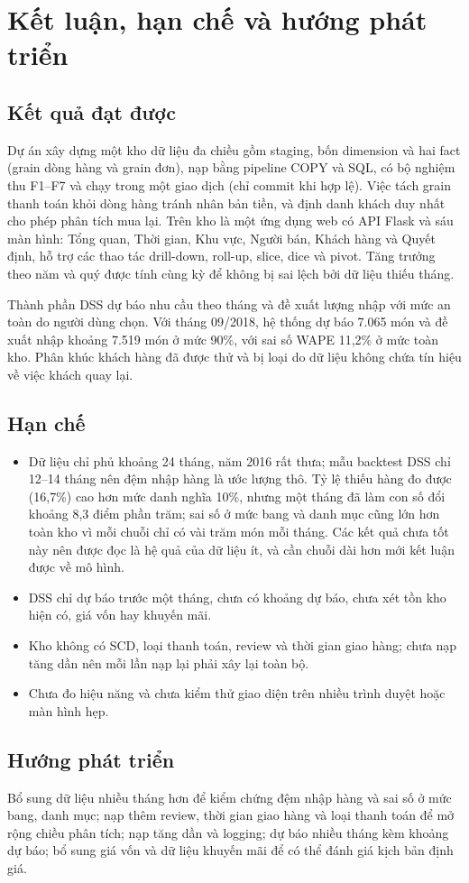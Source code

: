 \section{Kết luận, hạn chế và hướng phát triển}
\subsection{Kết quả đạt được}
Dự án xây dựng một kho dữ liệu đa chiều gồm staging, bốn dimension và hai fact (grain dòng hàng và grain đơn), nạp bằng pipeline COPY và SQL, có bộ nghiệm thu F1--F7 và chạy trong một giao dịch (chỉ commit khi hợp lệ). Việc tách grain thanh toán khỏi dòng hàng tránh nhân bản tiền, và định danh khách duy nhất cho phép phân tích mua lại. Trên kho là một ứng dụng web có API Flask và sáu màn hình: Tổng quan, Thời gian, Khu vực, Người bán, Khách hàng và Quyết định, hỗ trợ các thao tác drill-down, roll-up, slice, dice và pivot. Tăng trưởng theo năm và quý được tính cùng kỳ để không bị sai lệch bởi dữ liệu thiếu tháng.

Thành phần DSS dự báo nhu cầu theo tháng và đề xuất lượng nhập với mức an toàn do người dùng chọn. Với tháng 09/2018, hệ thống dự báo 7.065 món và đề xuất nhập khoảng 7.519 món ở mức 90\%, với sai số WAPE 11,2\% ở mức toàn kho. Phân khúc khách hàng đã được thử và bị loại do dữ liệu không chứa tín hiệu về việc khách quay lại.

\subsection{Hạn chế}
\begin{itemize}[leftmargin=*]
\item Dữ liệu chỉ phủ khoảng 24 tháng, năm 2016 rất thưa; mẫu backtest DSS chỉ 12--14 tháng nên đệm nhập hàng là ước lượng thô. Tỷ lệ thiếu hàng đo được (16,7\%) cao hơn mức danh nghĩa 10\%, nhưng một tháng đã làm con số đổi khoảng 8,3 điểm phần trăm; sai số ở mức bang và danh mục cũng lớn hơn toàn kho vì mỗi chuỗi chỉ có vài trăm món mỗi tháng. Các kết quả chưa tốt này nên được đọc là hệ quả của dữ liệu ít, và cần chuỗi dài hơn mới kết luận được về mô hình.
\item DSS chỉ dự báo trước một tháng, chưa có khoảng dự báo, chưa xét tồn kho hiện có, giá vốn hay khuyến mãi.
\item Kho không có SCD, loại thanh toán, review và thời gian giao hàng; chưa nạp tăng dần nên mỗi lần nạp lại phải xây lại toàn bộ.
\item Chưa đo hiệu năng và chưa kiểm thử giao diện trên nhiều trình duyệt hoặc màn hình hẹp.
\end{itemize}

\subsection{Hướng phát triển}
Bổ sung dữ liệu nhiều tháng hơn để kiểm chứng đệm nhập hàng và sai số ở mức bang, danh mục; nạp thêm review, thời gian giao hàng và loại thanh toán để mở rộng chiều phân tích; nạp tăng dần và logging; dự báo nhiều tháng kèm khoảng dự báo; bổ sung giá vốn và dữ liệu khuyến mãi để có thể đánh giá kịch bản định giá.
